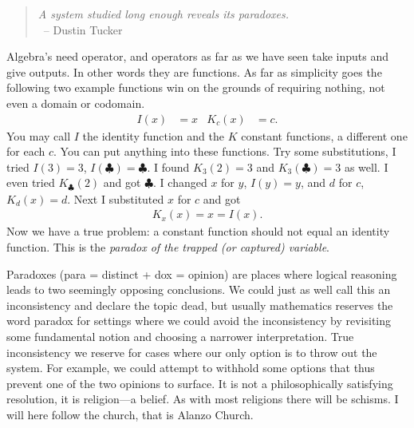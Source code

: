 \begin{quote}
\emph{A system studied long enough reveals its paradoxes.}\\
~\hfill-- Dustin Tucker
\end{quote}
Algebra's need operator, and operators as far as we have seen take 
inputs and give outputs.  In other words they are functions.  
As far as simplicity goes the following two example functions win 
on the grounds of requiring nothing, not even a domain or codomain.
\begin{align*}
    I(x) & = x & 
    K_c(x) & = c.
\end{align*}
You may call $I$ the identity function and the $K$ constant functions,
a different one for each $c$.  You can put anything into these functions.
Try some substitutions, I tried $I(3)=3$, $I(\clubsuit)=\clubsuit$.
I found $K_3(2)=3$ and $K_3(\clubsuit)=3$ as well.  I even tried 
$K_{\clubsuit}(2)$ and got $\clubsuit$.  I changed $x$ for $y$, 
$I(y)=y$, and $d$ for $c$, $K_d(x)=d$. Next I substituted $x$ for $c$ and got
\begin{align*}
    K_x(x)=x=I(x).
\end{align*}
Now we have a true problem: a constant function should not equal 
an identity function.  This is the \emph{paradox of the trapped (or captured) variable}.

Paradoxes (para = distinct + dox = opinion) are places where logical 
reasoning leads to two seemingly opposing conclusions.  We could just 
as well call this an inconsistency and declare the topic dead, but usually 
mathematics reserves the word paradox for settings where we could avoid the 
inconsistency by revisiting some fundamental notion and choosing a narrower 
interpretation.  True inconsistency we reserve for cases where our only option 
is to throw out the system.  For example, we could attempt to withhold some options that thus prevent one of the two opinions to surface.  It is not a philosophically satisfying resolution, it is religion---a belief.
As with most religions there will be schisms.  I will here follow the 
church, that is Alanzo Church.
